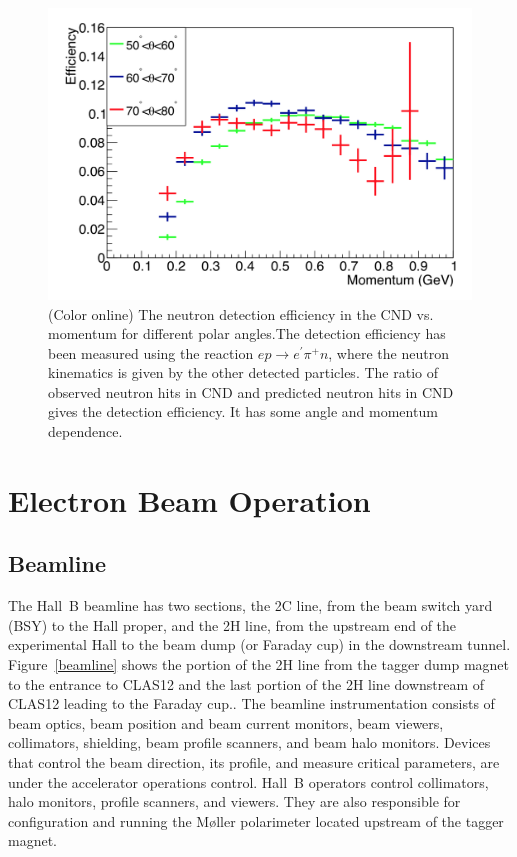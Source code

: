 \documentclass[final,3p,twocolumn]{elsarticle}
\begin{document}
\begin{figure}[htbp!]
\centerline{\includegraphics[width=0.9\columnwidth]{cnd-neutron-efficiency.png}}
\caption{(Color online) The neutron detection efficiency in the CND vs. momentum for different polar angles.The  detection efficiency 
has been measured using the reaction $e p \to e^\prime \pi^+ n$, where the neutron kinematics is given by the other 
detected particles. The ratio of observed neutron hits in CND and predicted neutron hits in CND gives the detection efficiency. It 
has some angle and momentum dependence.  } 
\label{CND-neutron-efficiency}
\end{figure} 


\section{Electron Beam Operation} 

\subsection{Beamline}

The Hall~B beamline has two sections, the 2C line, from the beam switch yard (BSY) to the Hall proper, and the 2H
line, from the upstream end of the experimental Hall to the beam dump (or Faraday cup) in the downstream tunnel.
Figure~\ref{beamline} shows the portion of the 2H line from the tagger dump magnet to the entrance to CLAS12 and
the last portion of the 2H line downstream of CLAS12 leading to the Faraday cup.. The beamline instrumentation
consists of beam optics, beam position and beam current monitors, beam viewers, collimators,  shielding, beam
profile scanners, and beam halo monitors. Devices that control the beam direction, its profile, and  measure critical
parameters, are under the accelerator operations control. Hall~B operators control collimators, halo monitors,
profile scanners, and viewers. They are also responsible for configuration and running the M{\o}ller polarimeter
located upstream of the tagger magnet.
\end{document}
